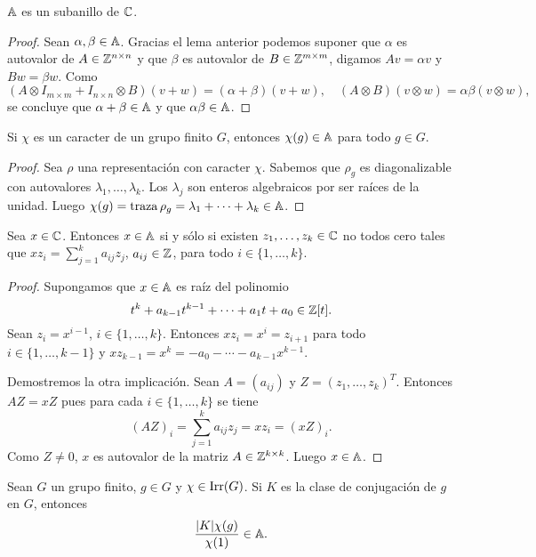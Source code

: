 \begin{theorem}
  \label{theorem:subanillo}
  $\mathbb{A}$ es un subanillo de $\mathbb{C}$.
\end{theorem}

\begin{proof}
  Sean $\alpha,\beta\in\mathbb{A}$. Gracias el lema anterior podemos suponer que $\alpha$ es autovalor de
  $A\in\mathbb{Z}^{n\times n}$ y que $\beta$ es autovalor de $B\in\mathbb{Z}^{m\times m}$, digamos
  $Av=\alpha v$ y $Bw=\beta w$.  Como 
  \[
	(A\otimes I_{m\times m}+I_{n\times n}\otimes B)(v+w)=(\alpha+\beta)(v+w),
	\quad
	(A\otimes B)(v\otimes w)=\alpha\beta(v\otimes w),
  \]
  se concluye que $\alpha+\beta\in\mathbb{A}$ y que $\alpha\beta\in\mathbb{A}$. 
\end{proof}

\begin{theorem}
  \label{theorem:chi(g)inA}
  Si $\chi$ es un caracter de un grupo finito $G$, entonces $\chi(g)\in\mathbb{A}$ para todo
  $g\in G$.
\end{theorem}

\begin{proof}
  Sea $\rho$ una representación con caracter $\chi$. Sabemos que $\rho_g$
  es diagonalizable con autovalores $\lambda_1,\dots,\lambda_k$. Los
  $\lambda_j$ son enteros algebraicos por ser raíces de la unidad. Luego
  $\chi(g)=\operatorname{traza}\rho_g=\lambda_1+\cdots+\lambda_k\in\mathbb{A}$.
\end{proof}

\begin{lemma}
  \label{lem:combinacion_lineal}
  Sea $x\in\mathbb{C}$. Entonces $x\in\mathbb{A}$ si y sólo si existen $z_1,\dots,z_k\in\mathbb{C}$ no
  todos cero tales que $xz_i=\sum_{j=1}^ka_{ij}z_j$, $a_{ij}\in\mathbb{Z}$, para todo
  $i\in\{1,\dots,k\}$.
\end{lemma}

\begin{proof}
  Supongamos que $x\in\mathbb{A}$ es raíz del polinomio 
  \[
    t^k+a_{k-1}t^{k-1}+\cdots+a_1t+a_0\in\mathbb{Z}[t].
  \]
  Sean $z_i=x^{i-1}$, $i\in\{1,\dots,k\}$. Entonces $xz_i=x^i=z_{i+1}$ para
  todo $i\in\{1,\dots,k-1\}$ y $xz_{k-1}=x^k=-a_{0}-\cdots-a_{k-1}x^{k-1}$.

  Demostremos la otra implicación. Sean $A=(a_{ij})$ y $Z=(z_1,\dots,z_k)^T$. 
  Entonces $AZ=xZ$ pues para cada $i\in\{1,\dots,k\}$ se tiene
  \[
    (AZ)_i=\sum_{j=1}^ka_{ij}z_j=xz_i=(xZ)_i.
  \]
  Como $Z\ne0$, $x$ es autovalor de la matriz $A\in\mathbb{Z}^{k\times k}$. Luego
  $x\in\mathbb{A}$.
\end{proof}

\begin{theorem}
  \label{theorem:algebraic}
  Sean $G$ un grupo finito, $g\in G$ y $\chi\in\operatorname{Irr}(G)$. Si $K$ es la clase de
  conjugación de $g$ en $G$, entonces
  \[
    \frac{|K|\chi(g)}{\chi(1)}\in\mathbb{A}.
  \]
\end{theorem}

